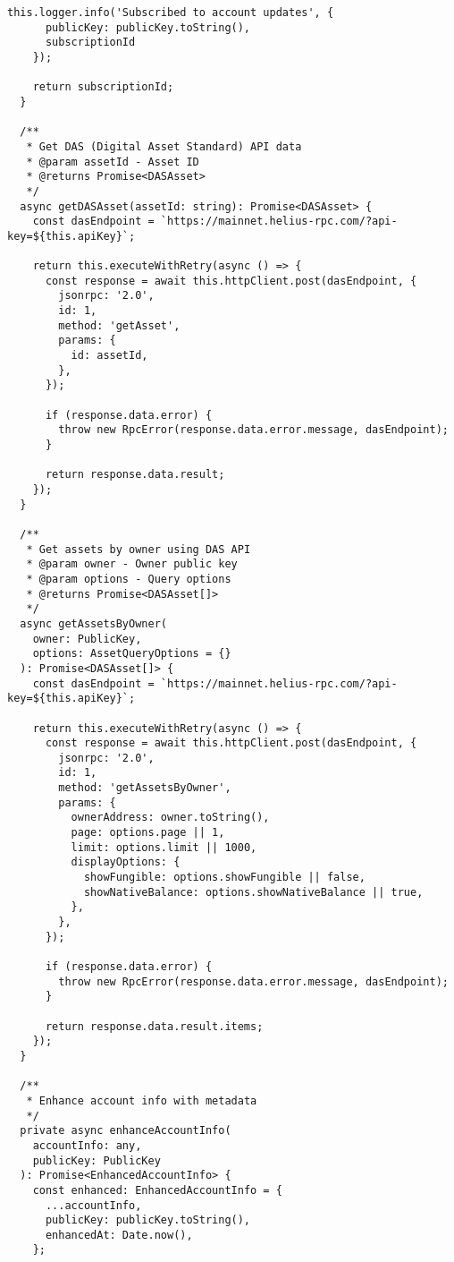 \documentclass[11pt,a4paper]{article}
\begin{document}
\begin{lstlisting}[style=typescript, caption=Helius RPC Service with Advanced Features]
    this.logger.info('Subscribed to account updates', { 
      publicKey: publicKey.toString(),
      subscriptionId 
    });

    return subscriptionId;
  }

  /**
   * Get DAS (Digital Asset Standard) API data
   * @param assetId - Asset ID
   * @returns Promise<DASAsset>
   */
  async getDASAsset(assetId: string): Promise<DASAsset> {
    const dasEndpoint = `https://mainnet.helius-rpc.com/?api-key=${this.apiKey}`;
    
    return this.executeWithRetry(async () => {
      const response = await this.httpClient.post(dasEndpoint, {
        jsonrpc: '2.0',
        id: 1,
        method: 'getAsset',
        params: {
          id: assetId,
        },
      });

      if (response.data.error) {
        throw new RpcError(response.data.error.message, dasEndpoint);
      }

      return response.data.result;
    });
  }

  /**
   * Get assets by owner using DAS API
   * @param owner - Owner public key
   * @param options - Query options
   * @returns Promise<DASAsset[]>
   */
  async getAssetsByOwner(
    owner: PublicKey,
    options: AssetQueryOptions = {}
  ): Promise<DASAsset[]> {
    const dasEndpoint = `https://mainnet.helius-rpc.com/?api-key=${this.apiKey}`;
    
    return this.executeWithRetry(async () => {
      const response = await this.httpClient.post(dasEndpoint, {
        jsonrpc: '2.0',
        id: 1,
        method: 'getAssetsByOwner',
        params: {
          ownerAddress: owner.toString(),
          page: options.page || 1,
          limit: options.limit || 1000,
          displayOptions: {
            showFungible: options.showFungible || false,
            showNativeBalance: options.showNativeBalance || true,
          },
        },
      });

      if (response.data.error) {
        throw new RpcError(response.data.error.message, dasEndpoint);
      }

      return response.data.result.items;
    });
  }

  /**
   * Enhance account info with metadata
   */
  private async enhanceAccountInfo(
    accountInfo: any,
    publicKey: PublicKey
  ): Promise<EnhancedAccountInfo> {
    const enhanced: EnhancedAccountInfo = {
      ...accountInfo,
      publicKey: publicKey.toString(),
      enhancedAt: Date.now(),
    };


\end{lstlisting}
\end{document}
